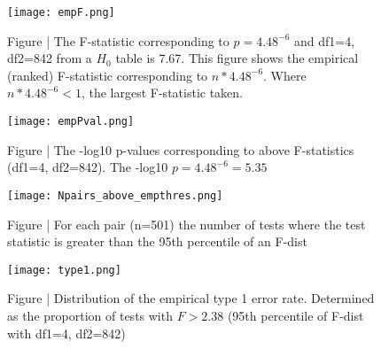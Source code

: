 \documentclass[paper=a4, fontsize=11pt]{scrartcl}					%
\numberwithin{equation}{section}									%
\numberwithin{figure}{section}										%
\numberwithin{table}{section}										%
\begin{document}
\newpage

\begin{figure}[H]
\centering
\texttt{[image: empF.png]}
\caption*{Figure | The F-statistic corresponding to $p=4.48^{-6}$ and df1=4, df2=842 from a $H_0$ table is 7.67. This figure shows the empirical (ranked) F-statistic corresponding to $n * 4.48^{-6}$. Where $n * 4.48^{-6} < 1$, the largest F-statistic taken.}
\end{figure}


\begin{figure}[H]
\centering
\texttt{[image: empPval.png]}
\caption*{Figure | The -log10 p-values corresponding to above F-statistics (df1=4, df2=842). The -log10 $p=4.48^{-6} = 5.35$}
\end{figure}



\newpage

\begin{figure}[H]
\centering
\texttt{[image: Npairs\_above\_empthres.png]}
\caption*{Figure | For each pair (n=501) the number of tests where the test statistic is greater than the 95th percentile of an F-dist}
\end{figure}


\begin{figure}[H]
\centering
\texttt{[image: type1.png]}
\caption*{Figure | Distribution of the empirical type 1 error rate. Determined as the proportion of tests with $F > 2.38$ (95th percentile of F-dist with df1=4, df2=842)}
\end{figure}



\newpage
\end{document}
